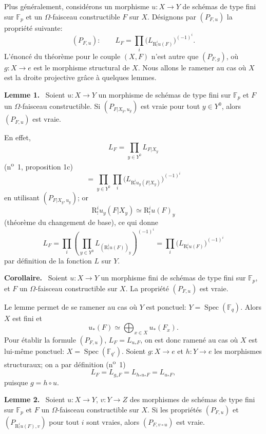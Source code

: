 \documentclass[11pt]{article}
\newenvironment{statement}[1]{\par\medskip\noindent\textbf{#1.}\ }{\par\medskip}
\DeclareMathOperator{\Spec}{Spec}
\newcommand{\R}{\mathrm{R}}\newcommand{\RHomCore}{\mathrm{RHom}}
\providecommand{\R}{\mathrm R}
\providecommand{\Spec}{\operatorname{Spec}}
\providecommand{\Spec}{\operatorname{Spec}}
\providecommand{\Spec}{\operatorname{Spec}}
\providecommand{\Spec}{\operatorname{Spec}}
\begin{document}
Plus généralement, considérons un morphisme $u:X\to Y$ de schémas de type fini sur $\mathbb F_p$ et un $\Omega$-faisceau constructible $F$ sur $X$. Désignons par $(P_{F,u})$ la propriété suivante:
\[
(P_{F,u}):\qquad
L_F=\prod_i\bigl(L_{\R^i_!u(F)}\bigr)^{(-1)^i}.
\]
L'énoncé du théorème pour le couple $(X,F)$ n'est autre que $(P_{F,g})$, où $g:X\to e$ est le morphisme structural de $X$. Nous allons le ramener au cas où $X$ est la droite projective grâce à quelques lemmes.

\begin{statement}{Lemme 1}
Soient $u:X\to Y$ un morphisme de schémas de type fini sur $\mathbb F_p$ et $F$ un $\Omega$-faisceau constructible. Si $(P_{F|X_y,u_y})$ est vraie pour tout $y\in Y^0$, alors $(P_{F,u})$ est vraie.
\end{statement}

En effet,
\[
L_F=\prod_{y\in Y^0}L_{F|X_y}
\]
(n\textsuperscript{o}~1, proposition 1c)
\[
=\prod_{y\in Y^0}\prod_i\bigl(L_{\R^i_!u_y(F|X_y)}\bigr)^{(-1)^i}
\]
en utilisant $(P_{F|X_y,u_y})$; or
\[
\R^i_!u_y(F|X_y)\simeq \R^i_!u(F)_y
\]
(théorème du changement de base), ce qui donne
\[
L_F=\prod_i\left(\prod_{y\in Y^0}L_{(\R^i_!u(F))_y}\right)^{(-1)^i}
=\prod_i\bigl(L_{\R^i_!u(F)}\bigr)^{(-1)^i}
\]
par définition de la fonction $L$ sur $Y$.

\begin{statement}{Corollaire}
Soient $u:X\to Y$ un morphisme fini de schémas de type fini sur $\mathbb F_p$, et $F$ un $\Omega$-faisceau constructible sur $X$. La propriété $(P_{F,u})$ est vraie.
\end{statement}

Le lemme permet de se ramener au cas où $Y$ est ponctuel: $Y=\Spec(\mathbb F_q)$. Alors $X$ est fini et
\[
u_*(F)\simeq \bigoplus_{x\in X}u_*(F_x).
\]
Pour établir la formule $(P_{F,u})$, $L_F=L_{u_*F}$, on est donc ramené au cas où $X$ est lui-même ponctuel: $X=\Spec(\mathbb F_{q'})$. Soient $g:X\to e$ et $h:Y\to e$ les morphismes structuraux; on a par définition (n\textsuperscript{o}~1)
\[
L_F=L_{g_*F}=L_{h_*u_*F}=L_{u_*F},
\]
puisque $g=h\circ u$.

\begin{statement}{Lemme 2}
Soient $u:X\to Y$, $v:Y\to Z$ des morphismes de schémas de type fini sur $\mathbb F_p$ et $F$ un $\Omega$-faisceau constructible sur $X$. Si les propriétés $(P_{F,u})$ et $(P_{\R^i_!u(F),v})$ pour tout $i$ sont vraies, alors $(P_{F,v\circ u})$ est vraie.
\end{statement}
\end{document}
